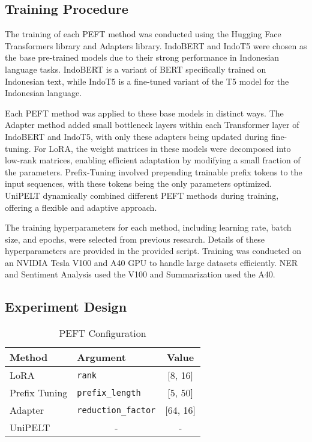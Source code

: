 \subsection{Training Procedure}

The training of each PEFT method was conducted using the Hugging Face Transformers library and Adapters library. IndoBERT and IndoT5 were chosen as the base pre-trained models due to their strong performance in Indonesian language tasks. IndoBERT is a variant of BERT specifically trained on Indonesian text, while IndoT5 is a fine-tuned variant of the T5 model for the Indonesian language.

Each PEFT method was applied to these base models in distinct ways. The Adapter method added small bottleneck layers within each Transformer layer of IndoBERT and IndoT5, with only these adapters being updated during fine-tuning. For LoRA, the weight matrices in these models were decomposed into low-rank matrices, enabling efficient adaptation by modifying a small fraction of the parameters. Prefix-Tuning involved prepending trainable prefix tokens to the input sequences, with these tokens being the only parameters optimized. UniPELT dynamically combined different PEFT methods during training, offering a flexible and adaptive approach.

The training hyperparameters for each method, including learning rate, batch size, and epochs, were selected from previous research. Details of these hyperparameters are provided in the provided script. Training was conducted on an NVIDIA Tesla V100 and A40 GPU to handle large datasets efficiently. NER and Sentiment Analysis used the V100 and Summarization used the A40.

\subsection{Experiment Design}

\begin{table}[htbp]
    \centering
    \caption{PEFT Configuration}
    \label{table:peft-configuration}
    \begin{tabular}{l|l|c}
        \toprule
        \textbf{Method} & \textbf{Argument} & \textbf{Value} \\
        \midrule
        LoRA & \texttt{rank} & [8, 16] \\
        Prefix Tuning & \texttt{prefix\_length} & [5, 50] \\
        Adapter & \texttt{reduction\_factor} & [64, 16] \\
        UniPELT & \multicolumn{1}{c|}{-}  & - \\
        \bottomrule
    \end{tabular}
\end{table}

